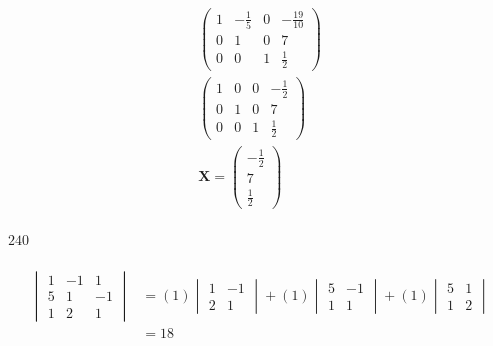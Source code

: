 \documentclass{article}
\begin{document}
\begin{align*}
  \left( \begin{array}{ccc|c}
             1 & -\frac{1}{5} & 0 & -\frac{19}{10} \\
             0 & 1            & 0 & 7              \\
             0 & 0            & 1 & \frac{1}{2}
           \end{array} \right)             \\
  \left( \begin{array}{ccc|c}
             1 & 0 & 0 & -\frac{1}{2} \\
             0 & 1 & 0 & 7            \\
             0 & 0 & 1 & \frac{1}{2}
           \end{array} \right)                          \\
  \mathbf{X} = \begin{pmatrix}
                 -\frac{1}{2} \\
                 7            \\
                 \frac{1}{2}
               \end{pmatrix}
\end{align*}

\setcounter{subsubsection}{28}
\subsubsection{}

$240$

\setcounter{subsubsection}{30}
\subsubsection{}

\begin{align*}
  \begin{vmatrix}
    1 & -1 & 1  \\
    5 & 1  & -1 \\
    1 & 2  & 1
  \end{vmatrix} & = (1) \begin{vmatrix}
                          1 & -1 \\
                          2 & 1
                        \end{vmatrix} + (1) \begin{vmatrix}
                                              5 & -1 \\
                                              1 & 1
                                            \end{vmatrix} + (1) \begin{vmatrix}
                                                                  5 & 1 \\
                                                                  1 & 2
                                                                \end{vmatrix} \\
                  & = 18
\end{align*}
\end{document}
